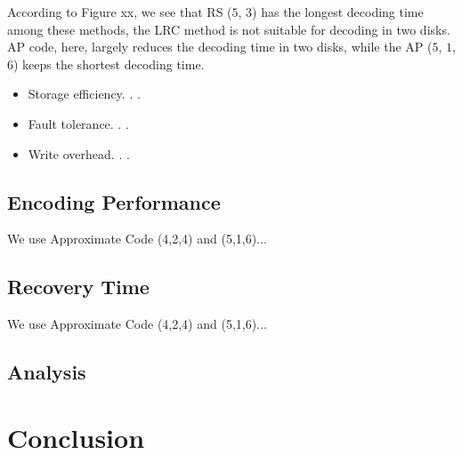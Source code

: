 \documentclass[sigconf]{acmart}
\begin{document}
According to Figure xx, we see that RS ($5$, $3$) has the longest decoding time among these methods, the LRC method is not suitable for decoding in two disks. AP code, here, largely reduces the decoding time in two disks, while the AP ($5$, $1$, $6$) keeps the shortest decoding time.

\begin{itemize}
    \item Storage efficiency. . .
    \item Fault tolerance. . .
    \item Write overhead. . .
\end{itemize}

\subsection{Encoding Performance}
We use Approximate Code (4,2,4) and (5,1,6)...

\subsection{Recovery Time}
We use Approximate Code (4,2,4) and (5,1,6)...

\subsection{Analysis}
\section{Conclusion}\label{Conclusion}



\begin{acks}

\end{acks}





\end{document}
